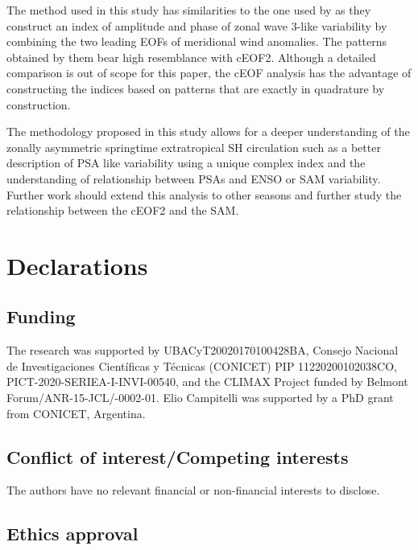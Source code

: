\documentclass[pdflatex,lineno,sn-basic]{sn-jnl}
\theoremstyle{thmstyleone}%
\theoremstyle{thmstyletwo}%
\theoremstyle{thmstylethree}%
\begin{document}
The method used in this study has similarities to the one used by \citet{goyal2022} as they construct an index of amplitude and phase of zonal wave 3-like variability by combining the two leading EOFs of meridional wind anomalies.
The patterns obtained by them bear high resemblance with cEOF2.
Although a detailed comparison is out of scope for this paper, the cEOF analysis has the advantage of constructing the indices based on patterns that are exactly in quadrature by construction.

The methodology proposed in this study allows for a deeper understanding of the zonally asymmetric springtime extratropical SH circulation such as a better description of PSA like variability using a unique complex index and the understanding of relationship between PSAs and ENSO or SAM variability.
Further work should extend this analysis to other seasons and further study the relationship between the cEOF2 and the SAM.

\backmatter

\hypertarget{declarations}{%
\section*{Declarations}\label{declarations}}

\hypertarget{funding}{%
\subsection*{Funding}\label{funding}}

The research was supported by UBACyT20020170100428BA, Consejo Nacional de Investigaciones Científicas y Técnicas (CONICET) PIP 11220200102038CO, PICT-2020-SERIEA-I-INVI-00540, and the CLIMAX Project funded by Belmont Forum/ANR-15-JCL/-0002-01. Elio Campitelli was supported by a PhD grant from CONICET, Argentina.

\hypertarget{conflict-of-interestcompeting-interests}{%
\subsection*{Conflict of interest/Competing interests}\label{conflict-of-interestcompeting-interests}}

The authors have no relevant financial or non-financial interests to disclose.

\hypertarget{ethics-approval}{%
\subsection*{Ethics approval}\label{ethics-approval}}
\end{document}
